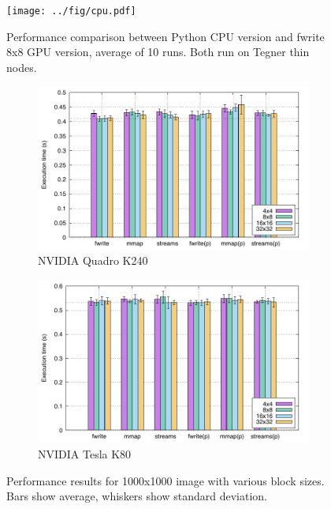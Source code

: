 \documentclass{article}
\begin{document}
\begin{figure}
    \centering
    \texttt{[image: ../fig/cpu.pdf]}
    \caption{Performance comparison between Python CPU version and fwrite 8x8
    GPU version, average of 10 runs. Both run on Tegner thin nodes.}
    \label{fig:cpu}
\end{figure}

\begin{figure}
    \begin{subfigure}{\linewidth}
        \includegraphics{../fig/sm30-1000.pdf}
        \caption{NVIDIA Quadro K240}
    \end{subfigure}
    \begin{subfigure}{\linewidth}
        \includegraphics{../fig/sm37-1000.pdf}
        \caption{NVIDIA Tesla K80}
    \end{subfigure}
    \caption{Performance results for 1000x1000 image with various block sizes. Bars show average, whiskers show
    standard deviation.}
\end{figure}
\end{document}
